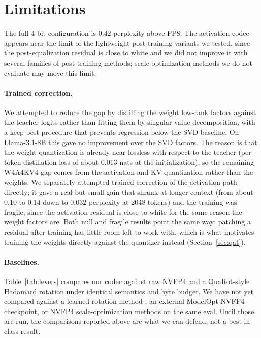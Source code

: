 \documentclass[11pt]{article}
\begin{document}
\section{Limitations}\label{sec:limits}
The full 4-bit configuration is 0.42 perplexity above FP8. The activation codec appears
near the limit of the lightweight post-training variants we tested, since the
post-equalization residual is close to white and we did not improve it with several
families of post-training methods; scale-optimization methods we do not evaluate
\cite{soar2026,fouroversix2025,scalesearch2026} may move this limit.

\paragraph{Trained correction.} We attempted to reduce the gap by distilling the weight
low-rank factors against the teacher logits rather than fitting them by singular value
decomposition, with a keep-best procedure that prevents regression below the SVD
baseline. On Llama-3.1-8B this gave no improvement over the SVD factors. The reason is
that the weight quantization is already near-lossless with respect to the teacher
(per-token distillation loss of about $0.013$ nats at the initialization), so the
remaining W4A4KV4 gap comes from the activation and KV quantization rather than the
weights. We separately attempted trained correction of the activation path directly;
it gave a real but small gain that shrank at longer context (from about $0.10$ to $0.14$
down to $0.032$ perplexity at 2048 tokens) and the training was fragile, since the
activation residual is close to white for the same reason the weight factors are.
Both null and fragile results point the same way: patching a residual after training
has little room left to work with, which is what motivates training the weights
directly against the quantizer instead (Section~\ref{sec:qat}).

\paragraph{Baselines.} Table~\ref{tab:levers} compares our codec against raw NVFP4 and a
QuaRot-style Hadamard rotation under identical semantics and byte budget. We have not yet
compared against a learned-rotation method \cite{liu2024spinquant}, an external ModelOpt
NVFP4 checkpoint, or NVFP4 scale-optimization methods \cite{soar2026,fouroversix2025,scalesearch2026} on
the same eval. Until those are run, the comparisons reported above are what we can
defend, not a best-in-class result.
\end{document}
